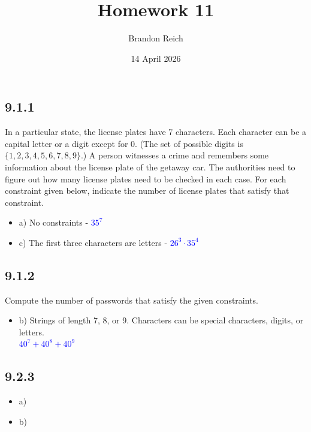 \documentclass{article}
\title{Homework 11}
\author{Brandon Reich}
\date{14 April 2026}
\begin{document}
\maketitle

\subsection*{9.1.1} In a particular state, the license plates have 7 characters. Each character can be a capital letter or a digit except for 0. (The set of possible digits is $\{1,2,3,4,5,6,7,8,9\}$.) A person witnesses a crime and remembers some information about the license plate of the getaway car. The authorities need to figure out how many license plates need to be checked in each case. For each constraint given below, indicate the number of license plates that satisfy that constraint.
\begin{itemize}
    \item a) No constraints - 
    \textcolor{blue}{$35^7$}
    \item c) The first three characters are letters - 
    \textcolor{blue}{$26^3 \cdot 35^4$}
\end{itemize}

\subsection*{9.1.2} Compute the number of passwords that satisfy the given constraints.
\begin{itemize}
    \item b) Strings of length 7, 8, or 9. Characters can be special characters, digits, or letters. \\
    \textcolor{blue}{$40^7 + 40^8 + 40^9$}
\end{itemize}

\subsection*{9.2.3}
\begin{itemize}
    \item a) \\

    \item b) \\
    \textcolor{blue}{}
\end{itemize}
\end{document}
